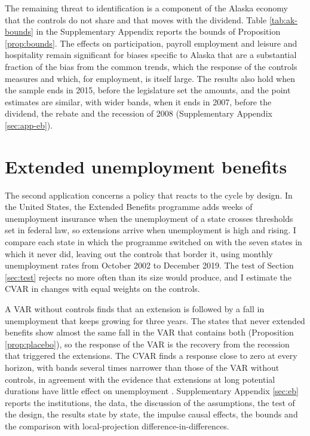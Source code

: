 \documentclass[12pt,a4paper]{article}
\theoremstyle{definition}
\theoremstyle{definition}\newtheorem{example}{Example}
\theoremstyle{definition}\newtheorem{definition}{Definition}
\begin{document}
The remaining threat to identification is a component of the Alaska economy that the controls do not share and that moves with the dividend. Table \ref{tab:ak-bounds} in the Supplementary Appendix reports the bounds of Proposition \ref{prop:bounds}. The effects on participation, payroll employment and leisure and hospitality remain significant for biases specific to Alaska that are a substantial fraction of the bias from the common trends, which the response of the controls measures and which, for employment, is itself large. The results also hold when the sample ends in 2015, before the legislature set the amounts, and the point estimates are similar, with wider bands, when it ends in 2007, before the dividend, the rebate and the recession of 2008 (Supplementary Appendix \ref{sec:app-eb}).


\section{Extended unemployment benefits\label{sec:ebsum}}

The second application concerns a policy that reacts to the cycle by design. In the United States, the Extended Benefits programme adds weeks of unemployment insurance when the unemployment of a state crosses thresholds set in federal law, so extensions arrive when unemployment is high and rising. I compare each state in which the programme switched on with the seven states in which it never did, leaving out the controls that border it, using monthly unemployment rates from October 2002 to December 2019. The test of Section \ref{sec:test} rejects no more often than its size would produce, and I estimate the CVAR in changes with equal weights on the controls.

A VAR without controls finds that an extension is followed by a fall in unemployment that keeps growing for three years. The states that never extended benefits show almost the same fall in the VAR that contains both (Proposition \ref{prop:placebo}), so the response of the VAR is the recovery from the recession that triggered the extensions. The CVAR finds a response close to zero at every horizon, with bands several times narrower than those of the VAR without controls, in agreement with the evidence that extensions at long potential durations have little effect on unemployment \citep{AcostaEtAl2025}. Supplementary Appendix \ref{sec:eb} reports the institutions, the data, the discussion of the assumptions, the test of the design, the results state by state, the impulse causal effects, the bounds and the comparison with local-projection difference-in-differences.
\end{document}
